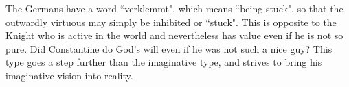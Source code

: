 The Germans have a word ``verklemmt", which means ``being stuck", so that the outwardly virtuous may simply be inhibited or ``stuck". This is opposite to the Knight who is active in the world and nevertheless has value even if he is not so pure. Did Constantine do God's will even if he was not such a nice guy? This type goes a step further than the imaginative type, and strives to bring his imaginative vision into reality.



